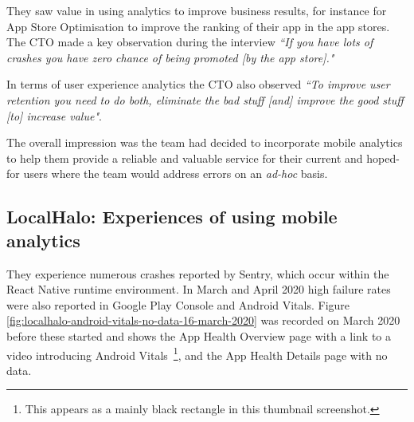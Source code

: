 They saw value in using analytics to improve business results, for instance for App Store Optimisation to improve the ranking of their app in the app stores. The CTO made a key observation during the interview \emph{``If you have lots of crashes you have zero chance of being promoted [by the app store]."}

In terms of user experience analytics the CTO also observed \emph{``To improve user retention you need to do both, eliminate the bad stuff [and] improve the good stuff [to] increase value"}.

The overall impression was the team had decided to incorporate mobile analytics to help them provide a reliable and valuable service for their current and hoped-for users where the team would address errors on an \emph{ad-hoc} basis.

\subsection{LocalHalo: Experiences of using mobile analytics}
They experience numerous crashes reported by Sentry, which occur within the React Native runtime environment. In March and April 2020 high failure rates were also reported in Google Play Console and Android Vitals. Figure \ref{fig:localhalo-android-vitals-no-data-16-march-2020} was recorded on  March 2020 before these started and shows the App Health Overview page with a link to a video introducing Android Vitals~\footnote{This appears as a mainly black rectangle in this thumbnail screenshot.}, and the App Health Details page with no data.

